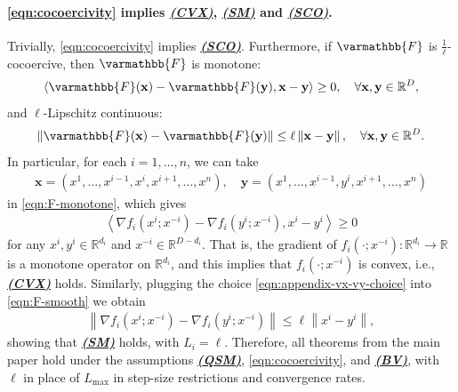 \documentclass{article}
\newcommand{\vx}{{\mathbf{x}}}
\newcommand{\vy}{{\mathbf{y}}}
\newcommand{\reals}{\mathbb{R}}
\newcommand{\opF}{{\varmathbb{F}}}
\newcommand{\inprod}[2]{\left\langle #1,#2 \right\rangle}
\newcommand{\norm}[1]{\left\|#1\right\|}
\theoremstyle{plain}
\theoremstyle{remark}
\begin{document}
\paragraph{\eqref{eqn:cocoercivity} implies \hyperref[assumption:convexity]{\textbf{\emph{(CVX)}}}, \hyperref[assumption:smoothness]{\textbf{\emph{(SM)}}} and \hyperref[assumption:star-cocoercivity]{\textbf{\emph{(SCO)}}}.}
Trivially, \eqref{eqn:cocoercivity} implies \hyperref[assumption:star-cocoercivity]{\textbf{\emph{(SCO)}}}.
Furthermore, if $\opF$ is $\frac{1}{\ell}$-cocoercive, then $\opF$ is monotone:
\begin{align}
    \inprod{\opF(\vx) - \opF(\vy)}{\vx - \vy} \ge 0, \quad \forall \vx, \vy \in \reals^D ,
    \label{eqn:F-monotone}
\end{align}
and $\ell$-Lipschitz continuous:
\begin{align}
    \norm{\opF(\vx) - \opF(\vy)} \le \ell \norm{\vx - \vy}, \quad \forall \vx, \vy \in \reals^D .
    \label{eqn:F-smooth}
\end{align}
In particular, for each $i=1,\dots,n$, we can take
\begin{align}
    \vx = (x^1,\dots,x^{i-1},x^i,x^{i+1},\dots,x^n) , \quad \vy = (x^1,\dots,x^{i-1},y^i,x^{i+1},\dots,x^n)
    \label{eqn:appendix-vx-vy-choice}
\end{align}
in \eqref{eqn:F-monotone}, which gives
\begin{align*}
    \inprod{\nabla f_i (x^i; x^{-i}) - \nabla f_i (y^i; x^{-i})}{x^i - y^i} \ge 0
\end{align*}
for any $x^i, y^i \in \reals^{d_i}$ and $x^{-i} \in \reals^{D - d_i}$.
That is, the gradient of $f_i(\cdot; x^{-i})\colon \reals^{d_i} \to \reals$ is a monotone operator on $\reals^{d_i}$, and this implies that $f_i(\cdot; x^{-i})$ is convex, i.e., \hyperref[assumption:convexity]{\textbf{\emph{(CVX)}}} holds.
Similarly, plugging the choice \eqref{eqn:appendix-vx-vy-choice} into \eqref{eqn:F-smooth} we obtain
\begin{align*}
    \norm{\nabla f_i (x^i; x^{-i}) - \nabla f_i (y^i; x^{-i})} \le \ell \norm{x^i - y^i} ,
\end{align*}
showing that \hyperref[assumption:smoothness]{\textbf{\emph{(SM)}}} holds, with $L_i = \ell$.
Therefore, all theorems from the main paper hold under the assumptions 
\hyperref[assumption:quasi-strong-monotonicity]{\textbf{\emph{(QSM)}}}, \eqref{eqn:cocoercivity}, and \hyperref[assumption:noise]{\textbf{\emph{(BV)}}}, with $\ell$ in place of $L_{\mathrm{max}}$ in step-size restrictions and convergence rates.
\end{document}
